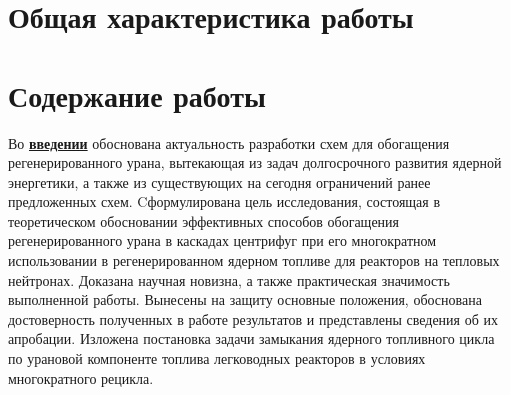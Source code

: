 \section*{Общая характеристика работы}

\newcommand{\actuality}{\underline{\textbf{\actualityTXT}}}
\newcommand{\progress}{\underline{\textbf{\progressTXT}}}
\newcommand{\aim}{\underline{{\textbf\aimTXT}}}
\newcommand{\tasks}{\underline{\textbf{\tasksTXT}}}
\newcommand{\novelty}{\underline{\textbf{\noveltyTXT}}}
\newcommand{\influence}{\underline{\textbf{\influenceTXT}}}
\newcommand{\methods}{\underline{\textbf{\methodsTXT}}}
\newcommand{\defpositions}{\underline{\textbf{\defpositionsTXT}}}
\newcommand{\reliability}{\underline{\textbf{\reliabilityTXT}}}
\newcommand{\probation}{\underline{\textbf{\probationTXT}}}
\newcommand{\contribution}{\underline{\textbf{\contributionTXT}}}
\newcommand{\publications}{\underline{\textbf{\publicationsTXT}}}




\section*{Содержание работы}
Во \underline{\textbf{введении}} обоснована актуальность разработки схем для обогащения регенерированного урана, вытекающая из задач долгосрочного развития ядерной энергетики, а также из существующих на сегодня ограничений ранее предложенных схем. Cформулирована цель исследования, состоящая в теоретическом обосновании эффективных способов обогащения регенерированного урана в каскадах цен­трифуг при его многократном использовании в регенерированном ядерном топливе для реакторов на тепловых нейтронах. Доказана научная новизна, а также практическая значимость выполненной работы. Вынесены на защиту основные положения, обоснована достоверность полученных в работе результатов и представлены сведения об их апробации. Изложена постановка задачи замыкания ядерного топливного цикла по урановой компоненте топлива легководных реакторов в условиях многократного рецикла.

